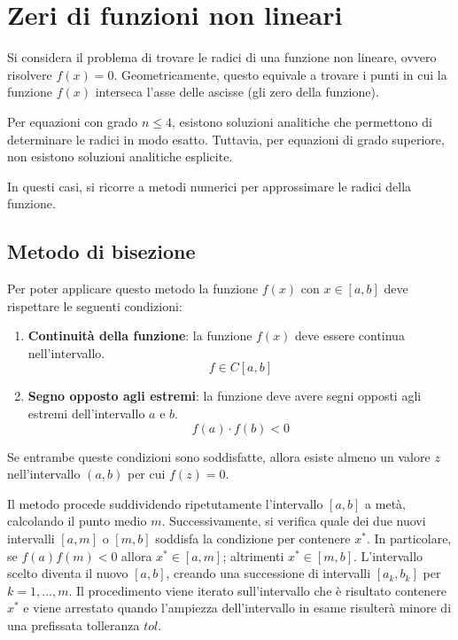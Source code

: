 \documentclass{article}
\begin{document}
\section{Zeri di funzioni non lineari}
Si considera  il problema di trovare le radici di una funzione non
lineare, ovvero risolvere $f(x)=0$. 
Geometricamente, questo equivale a trovare i punti in cui la funzione $f(x)$
interseca l'asse delle ascisse (gli zero della funzione). 

\begin{center}
\end{center}

Per equazioni con grado $n\leq 4$, esistono soluzioni analitiche che
permettono di determinare le radici in modo esatto. Tuttavia, per equazioni di
grado superiore, non esistono soluzioni analitiche esplicite.

In questi casi, si ricorre a metodi numerici per approssimare le radici della
funzione.
\subsection{Metodo di bisezione}
Per poter applicare questo metodo la funzione $f(x)$ con $x\in[a,b]$ deve
rispettare le seguenti condizioni:
\begin{enumerate}
    \item \textbf{Continuità della funzione}: la funzione $f(x)$ deve essere
        continua nell'intervallo.
        $$f\in C[a,b]$$
    \item \textbf{Segno opposto agli estremi}: la funzione deve avere segni
        opposti agli estremi dell'intervallo $a$ e $b$.
        $$f(a)\cdot f(b)<0$$
\end{enumerate}
Se entrambe queste condizioni sono soddisfatte, allora esiste almeno un valore
$z$ nell'intervallo $(a,b)$ per cui $f(z)=0$.

Il metodo procede suddividendo ripetutamente l'intervallo $[a,b]$ a metà,
calcolando il punto medio $m$. Successivamente, si verifica quale dei due
nuovi intervalli $[a,m]$ o $[m,b]$ soddisfa la condizione per contenere $x^*$.
In particolare, se $f(a)f(m)<0$ allora $x^*\in[a,m]$; altrimenti
$x^*\in[m,b]$. L'intervallo scelto diventa il nuovo $[a,b]$, creando una
successione di intervalli $[a_k, b_k]$ per $k=1,\ldots,m$. Il procedimento
viene iterato sull'intervallo che è risultato contenere $x^*$ e viene
arrestato quando l'ampiezza dell'intervallo in esame risulterà minore di una
prefissata tolleranza $tol$.
\end{document}
